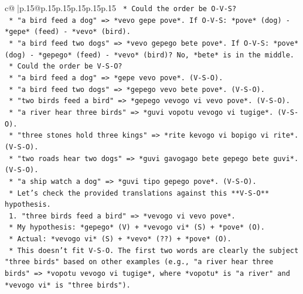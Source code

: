 \documentclass{article}
\begin{document}
{\begin{supertabular}{c@{$\;$}|p{.15\linewidth}@{}p{.15\linewidth}p{.15\linewidth}p{.15\linewidth}p{.15\linewidth}p{.15\linewidth}}
{{{\texttt{                            *   Could the order be O{-}V{-}S?} \\
\texttt{                                *   "a bird feed a dog" => *vevo gepe pove*. If O{-}V{-}S: *pove* (dog) {-} *gepe* (feed) {-} *vevo* (bird).} \\
\texttt{                                *   "a bird feed two dogs" => *vevo gepego bete pove*. If O{-}V{-}S: *pove* (dog) {-} *gepego* (feed) {-} *vevo* (bird)? No, *bete* is in the middle.} \\
\texttt{                            *   Could the order be V{-}S{-}O?} \\
\texttt{                                *   "a bird feed a dog" => *gepe vevo pove*. (V{-}S{-}O).} \\
\texttt{                                *   "a bird feed two dogs" => *gepego vevo bete pove*. (V{-}S{-}O).} \\
\texttt{                                *   "two birds feed a bird" => *gepego vevogo vi vevo pove*. (V{-}S{-}O).} \\
\texttt{                                *   "a river hear three birds" => *guvi vopotu vevogo vi tugige*. (V{-}S{-}O).} \\
\texttt{                                *   "three stones hold three kings" => *rite kevogo vi bopigo vi rite*. (V{-}S{-}O).} \\
\texttt{                                *   "two roads hear two dogs" => *guvi gavogago bete gepego bete guvi*. (V{-}S{-}O).} \\
\texttt{                                *   "a ship watch a dog" => *guvi tipo gepego pove*. (V{-}S{-}O).} \\
\texttt{                            *   Let's check the provided translations against this **V{-}S{-}O** hypothesis.} \\
\texttt{                                1.  "three birds feed a bird" => *vevogo vi vevo pove*.} \\
\texttt{                                    *   My hypothesis: *gepego* (V) + *vevogo vi* (S) + *pove* (O).} \\
\texttt{                                    *   Actual: *vevogo vi* (S) + *vevo* (??) + *pove* (O).} \\
\texttt{                                    *   This doesn't fit V{-}S{-}O. The first two words are clearly the subject "three birds" based on other examples (e.g., "a river hear three birds" => *vopotu vevogo vi tugige*, where *vopotu* is "a river" and *vevogo vi* is "three birds").} \\
}}}
\end{supertabular}}
\end{document}
